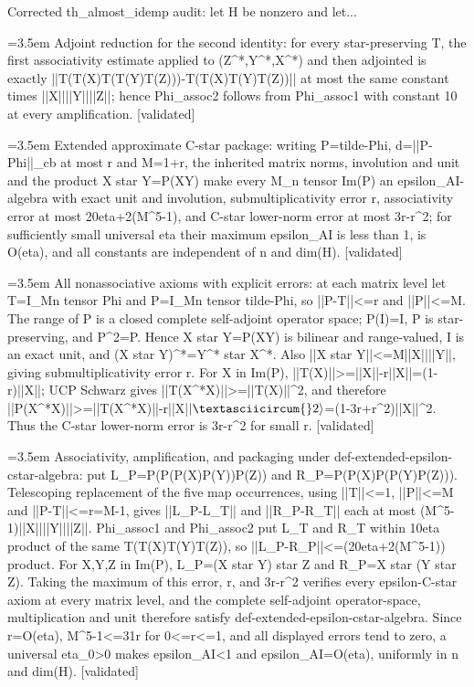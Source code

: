 \documentclass{article}
\newcommand{\step}[1]{\par\noindent\hangindent=3.5em\hangafter=1%
  \makebox[3.5em][l]{\textbf{#1.}}}
\newcommand{\steptag}[1]{\hfill{\small\textsf{[#1]}}}
\begin{document}
\begin{proofbox}{Corrected th\_almost\_idemp audit: let H be nonzero and let...}
\step{1.3} Adjoint reduction for the second identity: for every star-preserving T, the first associativity estimate applied to (Z\textasciicircum{}*,Y\textasciicircum{}*,X\textasciicircum{}*) and then adjointed is exactly ||T(T(X)T(T(Y)T(Z)))-T(T(X)T(Y)T(Z))|| at most the same constant times ||X||||Y||||Z||; hence Phi\_assoc2 follows from Phi\_assoc1 with constant 10 at every amplification. \steptag{validated} \\[4pt]
\step{1.4} Extended approximate C-star package: writing P=tilde-Phi, d=||P-Phi||\_cb at most r and M=1+r, the inherited matrix norms, involution and unit and the product X star Y=P(XY) make every M\_n tensor Im(P) an epsilon\_AI-algebra with exact unit and involution, submultiplicativity error r, associativity error at most 20eta+2(M\textasciicircum{}5-1), and C-star lower-norm error at most 3r-r\textasciicircum{}2; for sufficiently small universal eta their maximum epsilon\_AI is less than 1, is O(eta), and all constants are independent of n and dim(H). \steptag{validated} \\[6pt]
\step{1.4.1} All nonassociative axioms with explicit errors: at each matrix level let T=I\_Mn tensor Phi and P=I\_Mn tensor tilde-Phi, so ||P-T||<=r and ||P||<=M. The range of P is a closed complete self-adjoint operator space; P(I)=I, P is star-preserving, and P\textasciicircum{}2=P. Hence X star Y=P(XY) is bilinear and range-valued, I is an exact unit, and (X star Y)\textasciicircum{}*=Y\textasciicircum{}* star X\textasciicircum{}*. Also ||X star Y||<=M||X||||Y||, giving submultiplicativity error r. For X in Im(P), ||T(X)||>=||X||-r||X||=(1-r)||X||; UCP Schwarz gives ||T(X\textasciicircum{}*X)||>=||T(X)||\textasciicircum{}2, and therefore ||P(X\textasciicircum{}*X)||>=||T(X\textasciicircum{}*X)||-r||X|$|\textasciicircum{}2\rangle$=(1-3r+r\textasciicircum{}2)||X||\textasciicircum{}2. Thus the C-star lower-norm error is 3r-r\textasciicircum{}2 for small r. \steptag{validated} \\[4pt]
\step{1.4.2} Associativity, amplification, and packaging under def-extended-epsilon-cstar-algebra: put L\_P=P(P(P(X)P(Y))P(Z)) and R\_P=P(P(X)P(P(Y)P(Z))). Telescoping replacement of the five map occurrences, using ||T||<=1, ||P||<=M and ||P-T||<=r=M-1, gives ||L\_P-L\_T|| and ||R\_P-R\_T|| each at most (M\textasciicircum{}5-1)||X||||Y||||Z||. Phi\_assoc1 and Phi\_assoc2 put L\_T and R\_T within 10eta product of the same T(T(X)T(Y)T(Z)), so ||L\_P-R\_P||<=(20eta+2(M\textasciicircum{}5-1)) product. For X,Y,Z in Im(P), L\_P=(X star Y) star Z and R\_P=X star (Y star Z). Taking the maximum of this error, r, and 3r-r\textasciicircum{}2 verifies every epsilon-C-star axiom at every matrix level, and the complete self-adjoint operator-space, multiplication and unit therefore satisfy def-extended-epsilon-cstar-algebra. Since r=O(eta), M\textasciicircum{}5-1<=31r for 0<=r<=1, and all displayed errors tend to zero, a universal eta\_0>0 makes epsilon\_AI<1 and epsilon\_AI=O(eta), uniformly in n and dim(H). \steptag{validated} \\[6pt]

\end{proofbox}
\end{document}
